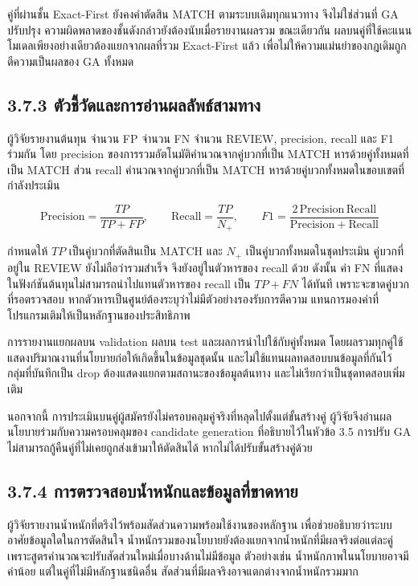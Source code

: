 \documentclass[12pt,a4paper]{report}
\begin{document}
คู่ที่ผ่านชั้น Exact-First ยังคงคำตัดสิน MATCH ตามระบบเดิมทุกแนวทาง จึงไม่ใช่ส่วนที่ GA ปรับปรุง ความผิดพลาดของชั้นดังกล่าวยังต้องนับเมื่อรายงานผลรวม ขณะเดียวกัน ผลบนคู่ที่ใช้คะแนนโมเดลเพียงอย่างเดียวต้องแยกจากผลที่รวม Exact-First แล้ว เพื่อไม่ให้ความแม่นยำของกฎเดิมถูกตีความเป็นผลของ GA ทั้งหมด

\subsection*{3.7.3 ตัวชี้วัดและการอ่านผลลัพธ์สามทาง}
ผู้วิจัยรายงานต้นทุน จำนวน FP จำนวน FN จำนวน REVIEW, precision, recall และ F1 ร่วมกัน โดย precision ของการรวมอัตโนมัติคำนวณจากคู่บวกที่เป็น MATCH หารด้วยคู่ทั้งหมดที่เป็น MATCH ส่วน recall คำนวณจากคู่บวกที่เป็น MATCH หารด้วยคู่บวกทั้งหมดในขอบเขตที่กำลังประเมิน

\begin{equation*}
\mathrm{Precision}=\frac{TP}{TP+FP},\qquad
\mathrm{Recall}=\frac{TP}{N_+},\qquad
F1=\frac{2\,\mathrm{Precision}\,\mathrm{Recall}}{\mathrm{Precision}+\mathrm{Recall}}
\end{equation*}

กำหนดให้ $TP$ เป็นคู่บวกที่ตัดสินเป็น MATCH และ $N_+$ เป็นคู่บวกทั้งหมดในชุดประเมิน คู่บวกที่อยู่ใน REVIEW ยังไม่ถือว่ารวมสำเร็จ จึงยังอยู่ในตัวหารของ recall ด้วย ดังนั้น ค่า FN ที่แสดงในฟังก์ชันต้นทุนไม่สามารถนำไปแทนตัวหารของ recall เป็น $TP+FN$ ได้ทันที เพราะจะขาดคู่บวกที่รอตรวจสอบ หากตัวหารเป็นศูนย์ต้องระบุว่าไม่มีตัวอย่างรองรับการตีความ แทนการมองค่าที่โปรแกรมเติมให้เป็นหลักฐานของประสิทธิภาพ

การรายงานแยกผลบน validation ผลบน test และผลการนำไปใช้กับคู่ทั้งหมด โดยผลรวมทุกคู่ใช้แสดงปริมาณงานที่นโยบายก่อให้เกิดขึ้นในข้อมูลชุดนั้น และไม่ใช้แทนผลทดสอบบนข้อมูลที่กันไว้ กลุ่มที่บันทึกเป็น drop ต้องแสดงแยกตามสถานะของข้อมูลต้นทาง และไม่เรียกว่าเป็นชุดทดสอบเพิ่มเติม

นอกจากนี้ การประเมินบนคู่ผู้สมัครยังไม่ครอบคลุมคู่จริงที่หลุดไปตั้งแต่ขั้นสร้างคู่ ผู้วิจัยจึงอ่านผลนโยบายร่วมกับความครอบคลุมของ candidate generation ที่อธิบายไว้ในหัวข้อ 3.5 การปรับ GA ไม่สามารถกู้คืนคู่ที่ไม่เคยถูกส่งเข้ามาให้ตัดสินได้ หากไม่ได้ปรับขั้นสร้างคู่ด้วย

\subsection*{3.7.4 การตรวจสอบน้ำหนักและข้อมูลที่ขาดหาย}
ผู้วิจัยรายงานน้ำหนักที่ตรึงไว้พร้อมสัดส่วนความพร้อมใช้งานของหลักฐาน เพื่อช่วยอธิบายว่าระบบอาศัยข้อมูลใดในการตัดสินใจ น้ำหนักรวมของนโยบายยังต้องแยกจากน้ำหนักที่มีผลจริงต่อแต่ละคู่ เพราะสูตรคำนวณจะปรับสัดส่วนใหม่เมื่อบางด้านไม่มีข้อมูล ตัวอย่างเช่น น้ำหนักภาพในนโยบายอาจมีค่าน้อย แต่ในคู่ที่ไม่มีหลักฐานชนิดอื่น สัดส่วนที่มีผลจริงอาจแตกต่างจากน้ำหนักรวมมาก
\end{document}
